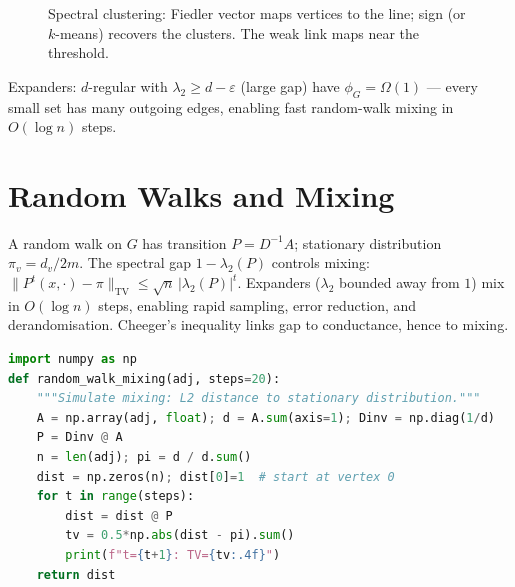 \begin{figure}[h]\centering
{}
\caption{Spectral clustering: Fiedler vector maps vertices to the line; sign (or $k$-means) recovers the clusters. The weak link maps near the threshold.}
\label{fig:spectral-clustering}
\end{figure}

Expanders: $d$-regular with $\lambda_2\ge d-\varepsilon$ (large gap) have $\phi_G=\Omega(1)$ --- every small set has many outgoing edges, enabling fast random-walk mixing in $O(\log n)$ steps.

\section{Random Walks and Mixing}
\label{sec:mixing}

A random walk on $G$ has transition $P=D^{-1}A$; stationary distribution $\pi_v=d_v/2m$. The spectral gap $1-\lambda_2(P)$ controls mixing: $\|P^t(x,\cdot)-\pi\|_{\text{TV}}\le\sqrt{n}\,|\lambda_2(P)|^t$. Expanders ($\lambda_2$ bounded away from $1$) mix in $O(\log n)$ steps, enabling rapid sampling, error reduction, and derandomisation. Cheeger's inequality links gap to conductance, hence to mixing.

\begin{lstlisting}[language=Python]
import numpy as np
def random_walk_mixing(adj, steps=20):
    """Simulate mixing: L2 distance to stationary distribution."""
    A = np.array(adj, float); d = A.sum(axis=1); Dinv = np.diag(1/d)
    P = Dinv @ A
    n = len(adj); pi = d / d.sum()
    dist = np.zeros(n); dist[0]=1  # start at vertex 0
    for t in range(steps):
        dist = dist @ P
        tv = 0.5*np.abs(dist - pi).sum()
        print(f"t={t+1}: TV={tv:.4f}")
    return dist
\end{lstlisting}

